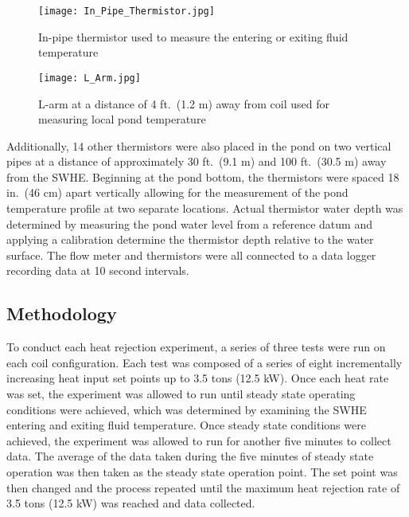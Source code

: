 	\begin{figure}
		\centering
		\texttt{[image: In\_Pipe\_Thermistor.jpg]}
		\caption[In-pipe thermistor used at SWHE inlet and oulet]{In-pipe thermistor used to measure the entering or exiting fluid temperature}
		\label{fig:ExpMethod:HeatRej:Apparatus:InPipeThermistor}
	\end{figure}


	\begin{figure}
		\centering
		\texttt{[image: L\_Arm.jpg]}
		\caption[L-arm on SWHE test frame]{L-arm at a distance of 4 ft.\ (1.2 m) away from coil used for measuring local pond temperature}
		\label{fig:ExpMethod:HeatRej:Apparatus:LArm}
	\end{figure}

Additionally, 14 other thermistors were also placed in the pond on two vertical pipes at a distance of approximately 30 ft.\ (9.1 m) and 100 ft.\ (30.5 m) away from the SWHE. Beginning at the pond bottom, the thermistors were spaced 18 in.\ (46 cm) apart vertically allowing for the measurement of the pond temperature profile at two separate locations. Actual thermistor water depth was determined by measuring the pond water level from a reference datum and applying a calibration determine the thermistor depth relative to the water surface. The flow meter and thermistors were all connected to a data logger recording data at 10 second intervals.

	\subsection{Methodology}
	\label{subsec:ExpMethod:HeatRej:Method}

To conduct each heat rejection experiment, a series of three tests were run on each coil configuration. Each test was composed of a series of eight incrementally increasing heat input set points up to 3.5 tons (12.5 kW). Once each heat rate was set, the experiment was allowed to run until steady state operating conditions were achieved, which was determined by examining the SWHE entering and exiting fluid temperature. Once steady state conditions were achieved, the experiment was allowed to run for another five minutes to collect data. The average of the data taken during the five minutes of steady state operation was then taken as the steady state operation point. The set point was then changed and the process repeated until the maximum heat rejection rate of 3.5 tons (12.5 kW) was reached and data collected.

